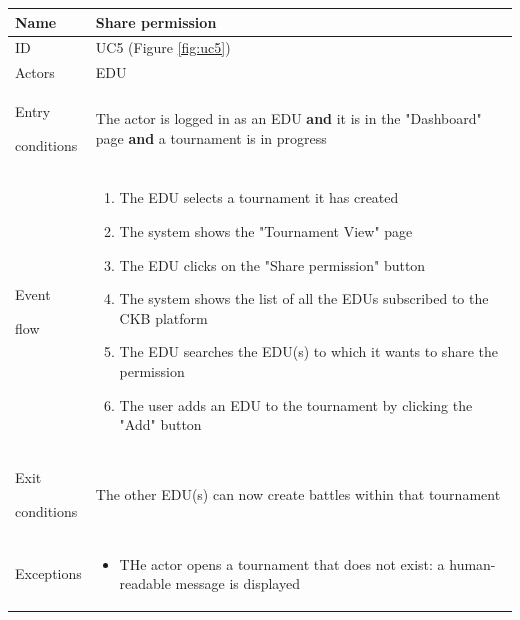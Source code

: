 \begin{center}
    \def\arraystretch{1.5}
    \begin{tabular}{| m{2cm} | m{10cm}|}
        \hline
        Name                  & Share permission                                                                                                     \\ \hline
        ID                    & UC5 (Figure \ref{fig:uc5})                                                                                           \\ \hline
        Actors                & EDU                                                                                                                  \\ \hline
        Entry \par conditions & The actor is logged in as an EDU \textbf{and} it is in the "Dashboard" page \textbf{and} a tournament is in progress \\ \hline
        Event \par flow       & \begin{enumerate}
                                    \item The EDU selects a tournament it has created
                                    \item The system shows the "Tournament View" page
                                    \item The EDU clicks on the "Share permission" button
                                    \item The system shows the list of all the EDUs subscribed to the CKB platform
                                    \item The EDU searches the EDU(s) to which it wants to share the permission
                                    \item The user adds an EDU to the tournament by clicking the "Add" button
                                \end{enumerate}                                        \\ \hline
        Exit \par conditions  & The other EDU(s) can now create battles within that tournament                                                       \\ \hline
        Exceptions            & \begin{itemize}
                                    \item THe actor opens a tournament that does not exist: a human-readable message is displayed

\end{itemize}
\end{tabular}
\end{center}
